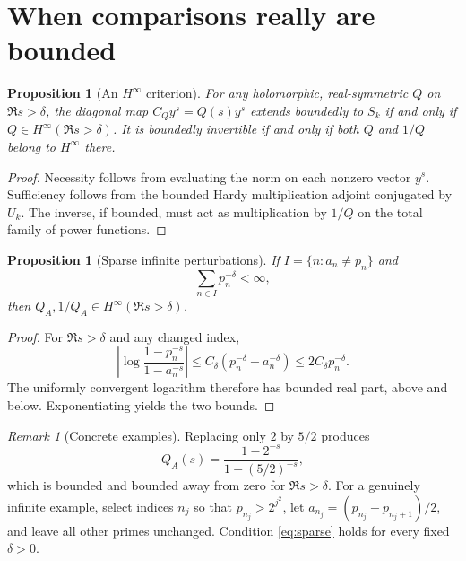 \documentclass[12pt,letterpaper]{article}
\newtheorem{proposition}[theorem]{Proposition}
\theoremstyle{remark}
\newtheorem{remark}[theorem]{Remark}
\numberwithin{equation}{section}
\begin{document}
\section{When comparisons really are bounded}\label{sec:bounded}
\begin{proposition}[An $H^\infty$ criterion]\label{prop:Hinfty}
For any holomorphic, real-symmetric $Q$ on $\Re s>\delta$, the diagonal map $C_Qy^s=Q(s)y^s$ extends boundedly to $S_k$ if and only if $Q\in H^\infty(\Re s>\delta)$. It is boundedly invertible if and only if both $Q$ and $1/Q$ belong to $H^\infty$ there.
\end{proposition}
\begin{proof}
Necessity follows from evaluating the norm on each nonzero vector $y^s$. Sufficiency follows from the bounded Hardy multiplication adjoint conjugated by $U_k$. The inverse, if bounded, must act as multiplication by $1/Q$ on the total family of power functions.
\end{proof}

\begin{proposition}[Sparse infinite perturbations]\label{prop:sparse}
If $I=\{n:a_n\ne p_n\}$ and
\begin{equation}\label{eq:sparse}
 \sum_{n\in I}p_n^{-\delta}<\infty,
\end{equation}
then $Q_A,1/Q_A\in H^\infty(\Re s>\delta)$.
\end{proposition}
\begin{proof}
For $\Re s>\delta$ and any changed index,
\[
 \left|\log\frac{1-p_n^{-s}}{1-a_n^{-s}}\right|
 \le C_\delta(p_n^{-\delta}+a_n^{-\delta})
 \le2C_\delta p_n^{-\delta}.
\]
The uniformly convergent logarithm therefore has bounded real part, above and below. Exponentiating yields the two bounds.
\end{proof}

\begin{remark}[Concrete examples]
Replacing only $2$ by $5/2$ produces
\[
 Q_A(s)=\frac{1-2^{-s}}{1-(5/2)^{-s}},
\]
which is bounded and bounded away from zero for $\Re s>\delta$. For a genuinely infinite example, select indices $n_j$ so that $p_{n_j}>2^{j^2}$, let $a_{n_j}=(p_{n_j}+p_{n_j+1})/2$, and leave all other primes unchanged. Condition \eqref{eq:sparse} holds for every fixed $\delta>0$.
\end{remark}
\end{document}
